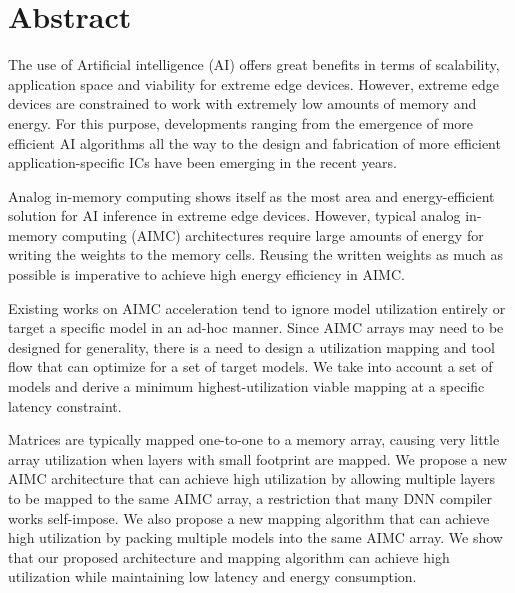 \chapter*{Abstract}
    
The use of Artificial intelligence (AI) offers great benefits in terms of scalability, application space and viability for extreme edge devices. However, extreme edge devices are constrained to work with extremely low amounts of memory and energy. For this purpose, developments ranging from the emergence of more efficient AI algorithms all the way to the design and fabrication of more efficient application-specific ICs have been emerging in the recent years. 

Analog in-memory computing shows itself as the most area and energy-efficient solution for AI inference in extreme edge devices. However, typical analog in-memory computing (AIMC) architectures require large amounts of energy for writing the weights to the memory cells. Reusing the written weights as much as possible is imperative to achieve high energy efficiency in AIMC. 

Existing works on AIMC acceleration tend to ignore model utilization entirely or target a specific model in an ad-hoc manner. Since AIMC arrays may need to be designed for generality, there is a need to design a utilization mapping and tool flow that can optimize for a set of target models. We take into account a set of models and derive a minimum highest-utilization viable mapping at a specific latency constraint.  

Matrices are typically mapped one-to-one to a memory array, causing very little array utilization when layers with small footprint are mapped. We propose a new AIMC architecture that can achieve high utilization by allowing multiple layers to be mapped to the same AIMC array, a restriction that many DNN compiler works self-impose. We also propose a new mapping algorithm that can achieve high utilization by packing multiple models into the same AIMC array. We show that our proposed architecture and mapping algorithm can achieve high utilization while maintaining low latency and energy consumption.
